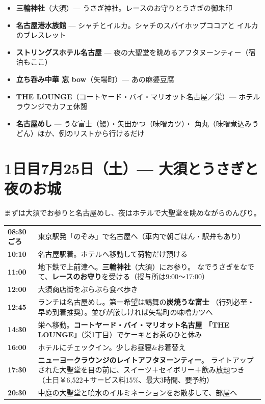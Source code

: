 \documentclass[a4paper,12pt]{article}
\theoremstyle{definition}
\theoremstyle{remark}
\newcommand{\slot}[2]{\textbf{#1} & #2 \\}
\begin{document}
\begin{itemize}[leftmargin=1.5em, itemsep=0.1em]
	\item \textbf{三輪神社}（大須）--- うさぎ神社。レースのお守りとうさぎの御朱印
	\item \textbf{名古屋港水族館} --- シャチとイルカ。シャチのスパイホップココアと
	      イルカのブレスレット
	\item \textbf{ストリングスホテル名古屋} --- 夜の大聖堂を眺めるアフタヌーンティー（宿泊もここ）
	\item \textbf{立ち呑み中華 忘 bow}（矢場町）--- あの麻婆豆腐
	\item \textbf{THE LOUNGE}（コートヤード・バイ・マリオット名古屋／栄）--- ホテルラウンジでカフェ休憩
	\item \textbf{名古屋めし} --- うな富士（鰻）・矢田かつ（味噌カツ）・
	      角丸（味噌煮込みうどん）ほか、例のリストから行けるだけ
\end{itemize}

\section*{1日目7月25日（土）--- 大須とうさぎと夜のお城}

まずは大須でお参りと名古屋めし、夜はホテルで大聖堂を眺めながらのんびり。

\begin{center}
	\begin{tabular}{p{7.5em}p{27em}}
		\toprule
		\slot{08:30ごろ}{東京駅発「のぞみ」で名古屋へ（車内で朝ごはん・駅弁もあり）}
		\slot{10:10}{名古屋駅着。ホテルへ移動して荷物だけ預ける}
		\slot{11:00}{地下鉄で上前津へ。\textbf{三輪神社}（大須）にお参り。
			なでうさぎをなでて、\textbf{レースのお守り}を受ける（授与所は9:00〜17:00）}
		\slot{12:00}{大須商店街をぶらぶら食べ歩き}
		\slot{12:45}{ランチは名古屋めし。第一希望は鶴舞の\textbf{炭焼うな富士}
			（行列必至・早め到着推奨）。並びが厳しければ矢場町の味噌カツへ}
		\slot{14:30}{栄へ移動。\textbf{コートヤード・バイ・マリオット名古屋
				「THE LOUNGE」}（栄1丁目）でケーキとお茶のひと休み}
		\slot{16:00}{ホテルにチェックイン。少しお昼寝\&お着替え}
		\slot{17:30}{\textbf{ニューヨークラウンジのレイトアフタヌーンティー}。
			ライトアップされた大聖堂を目の前に、スイーツ＋セイボリー＋飲み放題つき
			（土日￥6,522＋サービス料15\%、最大3時間、要予約）}
		\slot{20:30}{中庭の大聖堂と噴水のイルミネーションをお散歩して、部屋へ}
		\bottomrule
	\end{tabular}
\end{center}
\end{document}
